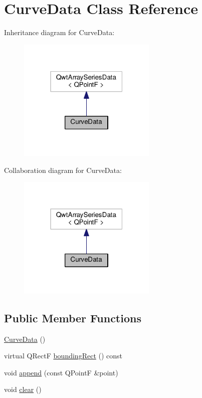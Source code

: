 \hypertarget{classCurveData}{}\section{Curve\+Data Class Reference}
\label{classCurveData}


Inheritance diagram for Curve\+Data\+:
\nopagebreak
\begin{figure}[H]
\begin{center}
\leavevmode
\includegraphics[width=187pt]{classCurveData__inherit__graph}
\end{center}
\end{figure}


Collaboration diagram for Curve\+Data\+:
\nopagebreak
\begin{figure}[H]
\begin{center}
\leavevmode
\includegraphics[width=187pt]{classCurveData__coll__graph}
\end{center}
\end{figure}
\subsection*{Public Member Functions}
\begin{DoxyCompactItemize}
\item 
\hyperlink{classCurveData_a4e9a1bb778f0cb2e7d573b88163cfd38}{Curve\+Data} ()
\item 
virtual Q\+RectF \hyperlink{classCurveData_ab915e8d2a5f879804584908a65c5c7f6}{bounding\+Rect} () const 
\item 
void \hyperlink{classCurveData_aff1e348b77d682b9ea65e7724d5679d5}{append} (const Q\+PointF \&point)
\item 
void \hyperlink{classCurveData_ae898810872a274a681ab60131ecf922b}{clear} ()
\end{DoxyCompactItemize}


